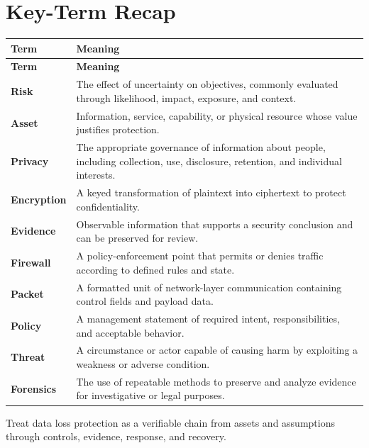 \documentclass[11pt]{article}
\begin{document}
\section*{Key-Term Recap}
\begin{longtable}{>{\RaggedRight\arraybackslash}p{}>{\RaggedRight\arraybackslash}p{}}
\toprule\rowcolor{Navy}\color{white}\textbf{Term} & \color{white}\textbf{Meaning}\\\midrule
\endfirsthead
\toprule\rowcolor{Navy}\color{white}\textbf{Term} & \color{white}\textbf{Meaning}\\\midrule
\endhead
\textbf{Risk} & The effect of uncertainty on objectives, commonly evaluated through likelihood, impact, exposure, and context. \\\midrule
\textbf{Asset} & Information, service, capability, or physical resource whose value justifies protection. \\\midrule
\textbf{Privacy} & The appropriate governance of information about people, including collection, use, disclosure, retention, and individual interests. \\\midrule
\textbf{Encryption} & A keyed transformation of plaintext into ciphertext to protect confidentiality. \\\midrule
\textbf{Evidence} & Observable information that supports a security conclusion and can be preserved for review. \\\midrule
\textbf{Firewall} & A policy-enforcement point that permits or denies traffic according to defined rules and state. \\\midrule
\textbf{Packet} & A formatted unit of network-layer communication containing control fields and payload data. \\\midrule
\textbf{Policy} & A management statement of required intent, responsibilities, and acceptable behavior. \\\midrule
\textbf{Threat} & A circumstance or actor capable of causing harm by exploiting a weakness or adverse condition. \\\midrule
\textbf{Forensics} & The use of repeatable methods to preserve and analyze evidence for investigative or legal purposes. \\\midrule
\bottomrule
\end{longtable}
\begin{takeawaybox}
Treat data loss protection as a verifiable chain from assets and assumptions through controls, evidence, response, and recovery.
\end{takeawaybox}
\end{document}
